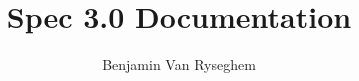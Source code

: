 \documentclass[12pt]{article}
\begin{document}
\title{Spec 3.0 Documentation}
\author{Benjamin Van Ryseghem}
\date{}
\maketitle


\end{document}
